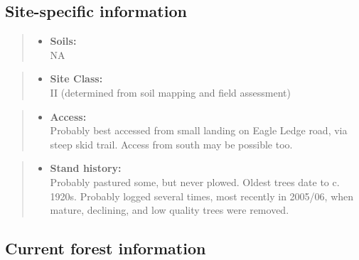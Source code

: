 \documentclass[]{tufte-handout}
\providecommand{\tightlist}{%
  \setlength{\itemsep}{0pt}\setlength{\parskip}{0pt}}
\begin{document}
\subsection{Site-specific
information}\label{site-specific-information-5}

\begin{quote}
\begin{itemize}
\tightlist
\item
  \textbf{Soils:}\\
  \indent\indent  NA
\end{itemize}
\end{quote}

\begin{quote}
\begin{itemize}
\tightlist
\item
  \textbf{Site Class:}\\
  \vspace{2pt} II (determined from soil mapping and field assessment)
\end{itemize}
\end{quote}

\begin{quote}
\begin{itemize}
\tightlist
\item
  \textbf{Access:}\\
  \vspace{2pt} Probably best accessed from small landing on Eagle Ledge
  road, via steep skid trail. Access from south may be possible too.
\end{itemize}
\end{quote}

\begin{quote}
\begin{itemize}
\tightlist
\item
  \textbf{Stand history:}\\
  \vspace{2pt} Probably pastured some, but never plowed. Oldest trees
  date to c. 1920s. Probably logged several times, most recently in
  2005/06, when mature, declining, and low quality trees were removed.
\end{itemize}
\end{quote}

\subsection{Current forest
information}\label{current-forest-information-5}
\end{document}
